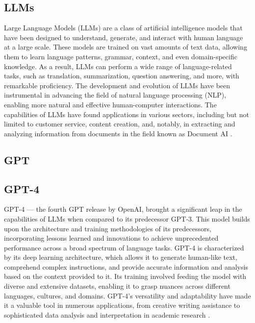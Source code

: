 \documentclass[english, 12pt, a4paper, elec, utf8, a-2b, online]{aaltothesis}
\begin{document}
\subsection{\ac{LLM}s}

Large Language Models (\ac{LLM}s) are a class of artificial intelligence models that have been designed to understand, generate, and interact with human language at a large scale.
These models are trained on vast amounts of text data, allowing them to learn language patterns, grammar, context, and even domain-specific knowledge.
As a result, \ac{LLM}s can perform a wide range of language-related tasks, such as translation, summarization, question answering, and more, with remarkable proficiency. The development and evolution of \ac{LLM}s have been instrumental in advancing the field of natural language processing (\ac{NLP}), enabling more natural and effective human-computer interactions.
The capabilities of \ac{LLM}s have found applications in various sectors, including but not limited to customer service, content creation, and, notably, in extracting and analyzing information from documents in the field known as Document AI \cite{}.

\subsection{\ac{GPT}}

\subsection{GPT-4}

GPT-4 --- the fourth \ac{GPT} release by OpenAI, brought a significant leap in the capabilities of \ac{LLM}s when compared to its predecessor \ac{GPT}-3.
This model builds upon the architecture and training methodologies of its predecessors, incorporating lessons learned and innovations to achieve unprecedented performance across a broad spectrum of language tasks.
GPT-4 is characterized by its deep learning architecture, which allows it to generate human-like text, comprehend complex instructions, and provide accurate information and analysis based on the context provided to it.
Its training involved feeding the model with diverse and extensive datasets, enabling it to grasp nuances across different languages, cultures, and domains.
GPT-4’s versatility and adaptability have made it a valuable tool in numerous applications, from creative writing assistance to sophisticated data analysis and interpretation in academic research \cite{OpenAI2023GPT4}.
\end{document}
